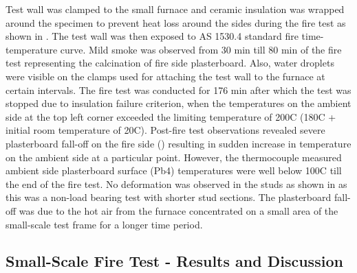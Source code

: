 Test wall was clamped to the small furnace and ceramic insulation was wrapped around the specimen to prevent heat loss around the sides during the fire test as shown in . The test wall was then exposed to AS 1530.4 standard fire time-temperature curve. Mild smoke was observed from 30 min till 80 min of the fire test representing the calcination of fire side plasterboard. Also, water droplets were visible on the clamps used for attaching the test wall to the furnace at certain intervals. The fire test was conducted for 176 min after which the test was stopped due to insulation failure criterion, when the temperatures on the ambient side at the top left corner exceeded the limiting temperature of 200\degree C (180\degree C + initial room temperature of 20\degree C). Post-fire test observations revealed severe plasterboard fall-off on the fire side () resulting in sudden increase in temperature on the ambient side at a particular point. However, the thermocouple measured ambient side plasterboard surface (Pb4) temperatures were well below 100\degree C till the end of the fire test. No deformation was observed in the studs as shown in  as this was a non-load bearing test with shorter stud sections. The plasterboard fall-off was due to the hot air from the furnace concentrated on a small area of the small-scale test frame for a longer time period.

\subsection{Small-Scale Fire Test - Results and Discussion}


